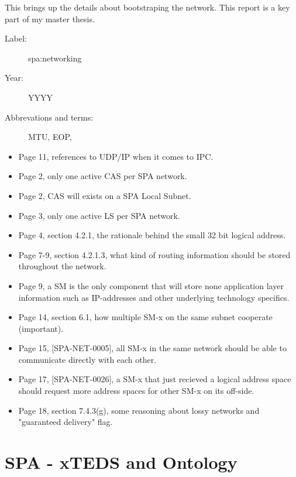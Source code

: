 This brings up the details about bootstraping the network. This report is a key
part of my master thesis.

\begin{description}
    \item[Label:] spa:networking \cite{spa:networking}
    \item[Year:] YYYY
    \item[Abbrevations and terms:]
        MTU,
        EOP,
\end{description}

\begin{itemize}
    \item Page 11, references to UDP/IP when it comes to IPC.
    \item Page 2, only one active CAS per SPA network.
    \item Page 2, CAS will exists on a SPA Local Subnet.
    \item Page 3, only one active LS per SPA network.
    \item Page 4, section 4.2.1, the rationale behind the small 32 bit logical
        address.
    \item Page 7-9, section 4.2.1.3, what kind of routing information should be
        stored throughout the network.
    \item Page 9, a SM is the only component that will store none application
        layer information such as IP-addresses and other underlying technology
        specifics.
    \item Page 14, section 6.1, how multiple SM-x on the same subnet cooperate
        (important).
    \item Page 15, [SPA-NET-0005], all SM-x in the same network should be able
        to communicate directly with each other.
    \item Page 17, [SPA-NET-0026], a SM-x that just recieved a logical address
        space should request more address spaces for other SM-x on its
        off-side.
    \item Page 18, section 7.4.3(g), some reasoning about lossy networks and
        "guaranteed delivery" flag.
\end{itemize}

\section{SPA - xTEDS and Ontology}

